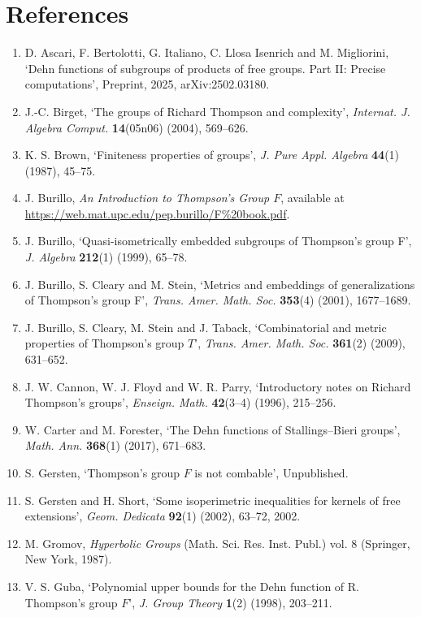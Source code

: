 \documentclass[10pt,a4paper]{article}
\begin{document}
\section*{References}
\begin{enumerate}
\renewcommand{\labelenumi}{[\arabic{enumi}]}
\item D. Ascari, F. Bertolotti, G. Italiano, C. Llosa Isenrich and M. Migliorini, `Dehn functions of subgroups of products of free groups. Part II: Precise computations', Preprint, 2025, arXiv:2502.03180.
\item J.-C. Birget, `The groups of Richard Thompson and complexity', \emph{Internat. J. Algebra Comput.} \textbf{14}(05n06) (2004), 569--626.
\item K. S. Brown, `Finiteness properties of groups', \emph{J. Pure Appl. Algebra} \textbf{44}(1) (1987), 45--75.
\item J. Burillo, \emph{An Introduction to Thompson's Group $F$}, available at \url{https://web.mat.upc.edu/pep.burillo/F%20book.pdf}.
\item J. Burillo, `Quasi-isometrically embedded subgroups of Thompson's group F', \emph{J. Algebra} \textbf{212}(1) (1999), 65--78.
\item J. Burillo, S. Cleary and M. Stein, `Metrics and embeddings of generalizations of Thompson's group F', \emph{Trans. Amer. Math. Soc.} \textbf{353}(4) (2001), 1677--1689.
\item J. Burillo, S. Cleary, M. Stein and J. Taback, `Combinatorial and metric properties of Thompson's group $T$', \emph{Trans. Amer. Math. Soc.} \textbf{361}(2) (2009), 631--652.
\item J. W. Cannon, W. J. Floyd and W. R. Parry, `Introductory notes on Richard Thompson's groups', \emph{Enseign. Math.} \textbf{42}(3--4) (1996), 215--256.
\item W. Carter and M. Forester, `The Dehn functions of Stallings--Bieri groups', \emph{Math. Ann.} \textbf{368}(1) (2017), 671--683.
\item S. Gersten, `Thompson's group $F$ is not combable', Unpublished.
\item S. Gersten and H. Short, `Some isoperimetric inequalities for kernels of free extensions', \emph{Geom. Dedicata} \textbf{92}(1) (2002), 63--72, 2002.
\item M. Gromov, \emph{Hyperbolic Groups} (Math. Sci. Res. Inst. Publ.) vol. 8 (Springer, New York, 1987).
\item V. S. Guba, `Polynomial upper bounds for the Dehn function of R. Thompson's group $F$', \emph{J. Group Theory} \textbf{1}(2) (1998), 203--211.

\end{enumerate}
\end{document}
